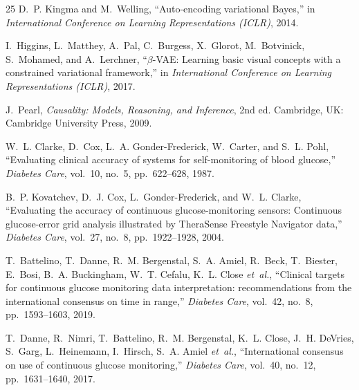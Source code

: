 \documentclass[conference]{IEEEtran}
\begin{document}
\begin{thebibliography}{25}
D.~P. Kingma and M.~Welling, ``Auto-encoding variational Bayes,'' in \emph{International Conference on Learning Representations (ICLR)}, 2014.

I.~Higgins, L.~Matthey, A.~Pal, C.~Burgess, X.~Glorot, M.~Botvinick, S.~Mohamed, and A.~Lerchner, ``$\beta$-VAE: Learning basic visual concepts with a constrained variational framework,'' in \emph{International Conference on Learning Representations (ICLR)}, 2017.

J.~Pearl, \emph{Causality: Models, Reasoning, and Inference}, 2nd ed. Cambridge, UK: Cambridge University Press, 2009.

W.~L. Clarke, D.~Cox, L.~A. Gonder-Frederick, W.~Carter, and S.~L. Pohl, ``Evaluating clinical accuracy of systems for self-monitoring of blood glucose,'' \emph{Diabetes Care}, vol.~10, no.~5, pp.~622--628, 1987.

B.~P. Kovatchev, D.~J. Cox, L.~Gonder-Frederick, and W.~L. Clarke, ``Evaluating the accuracy of continuous glucose-monitoring sensors: Continuous glucose-error grid analysis illustrated by TheraSense Freestyle Navigator data,'' \emph{Diabetes Care}, vol.~27, no.~8, pp.~1922--1928, 2004.

T.~Battelino, T.~Danne, R.~M. Bergenstal, S.~A. Amiel, R.~Beck, T.~Biester, E.~Bosi, B.~A. Buckingham, W.~T. Cefalu, K.~L. Close \emph{et~al.}, ``Clinical targets for continuous glucose monitoring data interpretation: recommendations from the international consensus on time in range,'' \emph{Diabetes Care}, vol.~42, no.~8, pp.~1593--1603, 2019.

T.~Danne, R.~Nimri, T.~Battelino, R.~M. Bergenstal, K.~L. Close, J.~H. DeVries, S.~Garg, L.~Heinemann, I.~Hirsch, S.~A. Amiel \emph{et~al.}, ``International consensus on use of continuous glucose monitoring,'' \emph{Diabetes Care}, vol.~40, no.~12, pp.~1631--1640, 2017.

\end{thebibliography}
\end{document}
